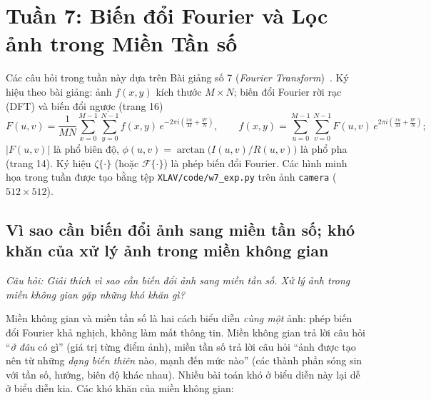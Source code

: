 \section{Tuần 7: Biến đổi Fourier và Lọc ảnh trong Miền Tần số}
\label{sec:week7}

Các câu hỏi trong tuần này dựa trên Bài giảng số 7 (\emph{Fourier Transform})~\citep{xlav_lec7}. Ký hiệu theo bài giảng: ảnh $f(x, y)$ kích thước $M \times N$; biến đổi Fourier rời rạc (DFT) và biến đổi ngược (trang 16)
\begin{equation}
F(u, v) = \frac{1}{MN}\sum_{x=0}^{M-1}\sum_{y=0}^{N-1} f(x, y)\,e^{-2\pi i\left(\frac{xu}{M} + \frac{yv}{N}\right)}, \qquad
f(x, y) = \sum_{u=0}^{M-1}\sum_{v=0}^{N-1} F(u, v)\,e^{2\pi i\left(\frac{xu}{M} + \frac{yv}{N}\right)};
\label{eq:w7_dft}
\end{equation}
$|F(u, v)|$ là phổ biên độ, $\phi(u, v) = \arctan\big(I(u, v)/R(u, v)\big)$ là phổ pha (trang 14). Ký hiệu $\zeta\{\cdot\}$ (hoặc $\mathcal{F}\{\cdot\}$) là phép biến đổi Fourier. Các hình minh họa trong tuần được tạo bằng tệp \texttt{XLAV/code/w7\_exp.py} trên ảnh \texttt{camera} ($512 \times 512$).

\subsection{Vì sao cần biến đổi ảnh sang miền tần số; khó khăn của xử lý ảnh trong miền không gian}
\label{subsec:w7_why_freq}

\textit{Câu hỏi: Giải thích vì sao cần biến đổi ảnh sang miền tần số. Xử lý ảnh trong miền không gian gặp những khó khăn gì?}

Miền không gian và miền tần số là hai cách biểu diễn \emph{cùng một} ảnh: phép biến đổi Fourier khả nghịch, không làm mất thông tin. Miền không gian trả lời câu hỏi ``\emph{ở đâu} có gì'' (giá trị từng điểm ảnh), miền tần số trả lời câu hỏi ``ảnh được tạo nên từ những \emph{dạng biến thiên} nào, mạnh đến mức nào'' (các thành phần sóng sin với tần số, hướng, biên độ khác nhau). Nhiều bài toán khó ở biểu diễn này lại dễ ở biểu diễn kia. Các khó khăn của miền không gian:

